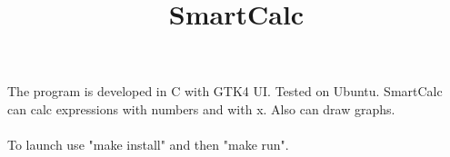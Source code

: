 \documentclass[12pt,twoside,a4paper]{article}
\begin{document}
\title{SmartCalc}
\date{}
\maketitle

\paragraph{}
The program is developed in C with GTK4 UI. Tested on Ubuntu. SmartCalc can calc expressions with numbers and with x.
Also can draw graphs.

\paragraph{}
To launch use "make install" and then "make run". 
\end{document}
